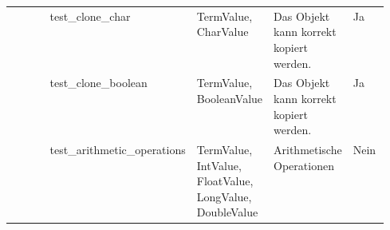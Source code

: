 \documentclass[parskip=full]{scrartcl}
\begin{document}
\begin{landscape}
\begin{table}
\begin{tabularx}{\linewidth}{ p{0.15\linewidth} | p{0.3\linewidth} | X | X | p{0.1\linewidth}}
        & test\_clone\_char                          & TermValue, CharValue          & Das Objekt kann korrekt kopiert werden.                                       & Ja\\
        & test\_clone\_boolean                       & TermValue, BooleanValue       & Das Objekt kann korrekt kopiert werden.                                       & Ja\\
        & test\_arithmetic\_operations               & TermValue, IntValue, FloatValue, LongValue, DoubleValue &Arithmetische Operationen                            & Nein\\
    \hline
    \end{tabularx} 
\end{table}
\end{landscape}
\end{document}
